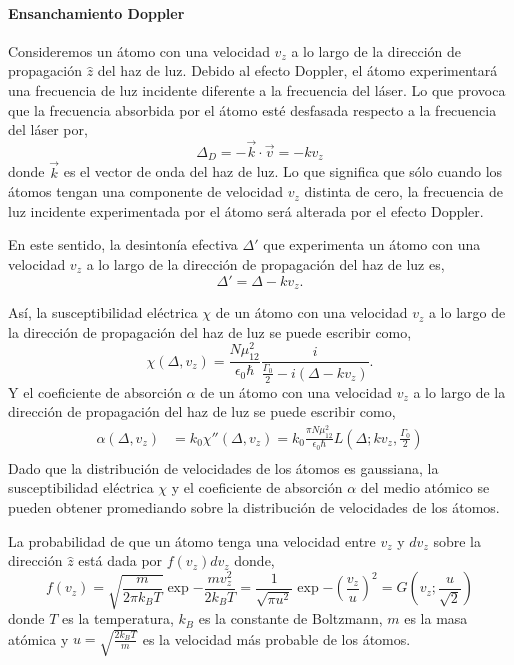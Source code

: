 \paragraph{Ensanchamiento Doppler}
Consideremos un átomo con una velocidad $v_z$ a lo largo de la dirección de propagación $\hat{z}$ del haz de luz. Debido al efecto Doppler, el átomo experimentará una frecuencia de luz incidente diferente a la frecuencia del láser. Lo que provoca que la frecuencia absorbida por el átomo esté desfasada respecto a la frecuencia del láser por,
\begin{equation}
\Delta_D = -\vec{k} \cdot \vec{v} = -k v_z
\end{equation}
donde $\vec{k}$ es el vector de onda del haz de luz. Lo que significa que sólo cuando los átomos tengan una componente de velocidad $v_z$ distinta de cero, la frecuencia de luz incidente experimentada por el átomo será alterada por el efecto Doppler.

En este sentido, la desintonía efectiva $\Delta'$ que experimenta un átomo con una velocidad $v_z$ a lo largo de la dirección de propagación del haz de luz es,
\begin{equation}
    \Delta' = \Delta - k v_z.
\end{equation}

Así, la susceptibilidad eléctrica $\chi$ de un átomo con una velocidad $v_z$ a lo largo de la dirección de propagación del haz de luz se puede escribir como,
\begin{equation}
    \chi(\Delta, v_z) = \frac{N \mu_{12}^2}{\epsilon_0 \hbar} \frac{i}{\frac{\Gamma_0}{2} - i(\Delta - k v_z)}.
\end{equation}
Y el coeficiente de absorción $\alpha$ de un átomo con una velocidad $v_z$ a lo largo de la dirección de propagación del haz de luz se puede escribir como,
\begin{equation}
\begin{split}
    \alpha(\Delta, v_z) &= k_0 \chi''(\Delta, v_z) = k_0 \frac{\pi N \mu_{12}^2}{\epsilon_0 \hbar} L\left(\Delta; kv_z, \frac{\Gamma_0}{2}\right)\\
\end{split}
\end{equation}
Dado que la distribución de velocidades de los átomos es gaussiana, la susceptibilidad eléctrica $\chi$ y el coeficiente de absorción $\alpha$ del medio atómico se pueden obtener promediando sobre la distribución de velocidades de los átomos. 

La probabilidad de que un átomo tenga una velocidad entre $v_z$ y $dv_z$ sobre la dirección $\hat{z}$ está dada por $f(v_z)dv_z$ donde, 
\begin{equation}
    f(v_z) = \sqrt{\frac{m}{2 \pi k_B T}} \exp {- \frac{m v_z^2}{2 k_B T}} = \frac{1}{\sqrt{\pi u^2}}\exp{-\left(\frac{v_z}{u}\right)^2} = G\left(v_z; \frac{u}{\sqrt{2}}\right)
\end{equation}
donde  $T$ es la temperatura, $k_B$ es la constante de Boltzmann, $m$ es la masa atómica y $u = \sqrt{\frac{2k_B T}{m}}$ es la velocidad más probable de los átomos. 

